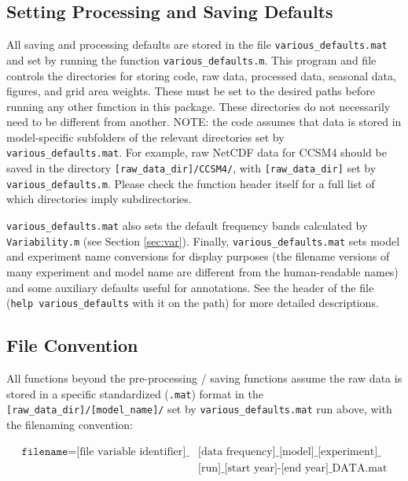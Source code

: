 \documentclass{article}
\begin{document}
\subsection{Setting Processing and Saving Defaults}\label{func:various_defaults.m}
All saving and processing defaults are stored in the file \texttt{various\_defaults.mat} and set by running the function \texttt{various\_defaults.m}. This program and file controls the directories for storing code, raw data, processed data, seasonal data, figures, and grid area weights. These must be set to the desired paths before running any other function in this package. These directories do not necessarily need to be different from another. NOTE: the code assumes that data is stored in model-specific subfolders of the relevant directories set by \texttt{various\_defaults.mat}. For example, raw NetCDF data for CCSM4 should be saved in the directory \texttt{[raw\_data\_dir]/CCSM4/}, with \texttt{[raw\_data\_dir]} set by \texttt{various\_defaults.m}. Please check the function header itself for a full list of which directories imply subdirectories. 

\texttt{various\_defaults.mat} also sets the default frequency bands calculated by \texttt{Variability.m} (see Section \ref{sec:var}). Finally, \texttt{various\_defaults.mat} sets model and experiment name conversions for display purposes (the filename versions of many experiment and model name are different from the human-readable names) and some auxiliary defaults useful for annotations. See the header of the file (\texttt{help various\_defaults} with it on the path) for more detailed descriptions.

\subsection{File Convention}
All functions beyond the pre-processing / saving functions assume the raw data is stored in a specific standardized (\texttt{.mat}) format in the \texttt{[raw\_data\_dir]/[model\_name]/} set by \texttt{various\_defaults.mat} run above, with the filenaming convention: 

\begin{equation}
\begin{split}
\texttt{filename} = \text{[file variable identifier]\_}&\text{[data frequency]\_[model]\_[experiment]\_}\\
&\text{[run]\_[start year]-[end year]\_DATA.mat}
\end{split}
\end{equation}
\end{document}
